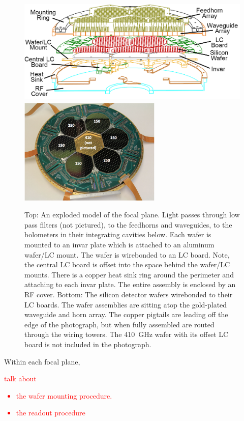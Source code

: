 \begin{figure}[htbp]
\begin{center}
\includegraphics[height=2.0in]{figures/focal_plane_outline_central_labeled.png}
\includegraphics[height=2.0in]{figures/focal_plane_photo.png}
\caption[EBEX focal plane]{Top: An exploded model of the focal plane. Light passes through low pass filters (not pictured), to the feedhorns and waveguides, to the bolometers in their integrating cavities below. Each wafer is mounted to an invar plate which is attached to an aluminum wafer/\ac{LC} mount. The wafer is wirebonded to an \ac{LC} board. Note, the central \ac{LC} board is offset into the space behind the wafer/\ac{LC} mounts. There is a copper heat sink ring around the perimeter and attaching to each invar plate. The entire assembly is enclosed by an RF cover. Bottom: The silicon detector wafers wirebonded to their \ac{LC} boards. The wafer assemblies are sitting atop the gold-plated waveguide and horn array. The copper pigtails are leading off the edge of the photograph, but when fully assembled are routed through the wiring towers. The 410~GHz wafer with its offset \ac{LC} board is not included in the photograph. 
\label{fig:focal_plane} }
\end{center}
\end{figure}

Within each focal plane, \textcolor{red}{talk about 
\begin{itemize}
\item the wafer mounting procedure. 
\item the readout procedure
\end{itemize}
}

